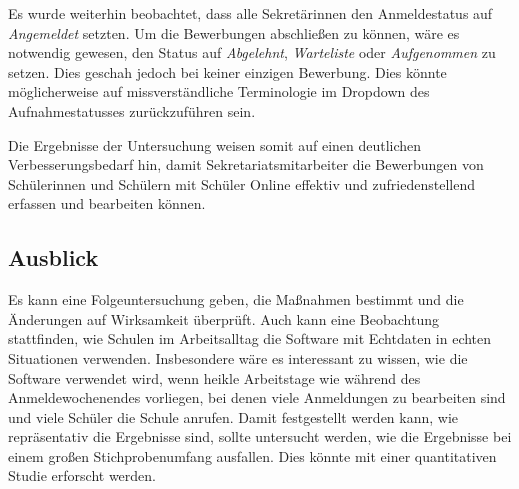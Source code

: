 Es wurde weiterhin beobachtet, dass alle Sekretärinnen den Anmeldestatus auf \textit{Angemeldet} setzten. Um die Bewerbungen abschließen zu können, wäre es notwendig gewesen, den Status auf \textit{Abgelehnt}, \textit{Warteliste} oder \textit{Aufgenommen} zu setzen. Dies geschah jedoch bei keiner einzigen Bewerbung. Dies könnte möglicherweise auf missverständliche Terminologie im Dropdown des Aufnahmestatusses zurückzuführen sein.

Die Ergebnisse der Untersuchung weisen somit auf einen deutlichen Verbesserungsbedarf hin, damit Sekretariatsmitarbeiter die Bewerbungen von Schülerinnen und Schülern mit Schüler Online effektiv und zufriedenstellend erfassen und bearbeiten können.

\subsection{Ausblick}
Es kann eine Folgeuntersuchung geben, die Maßnahmen bestimmt und die Änderungen auf Wirksamkeit überprüft.
Auch kann eine Beobachtung stattfinden, wie Schulen im Arbeitsalltag die Software mit Echtdaten in echten Situationen verwenden. Insbesondere wäre es interessant zu wissen, wie die Software verwendet wird, wenn heikle Arbeitstage wie während des Anmeldewochenendes vorliegen, bei denen viele Anmeldungen zu bearbeiten sind und viele Schüler die Schule anrufen.
Damit festgestellt werden kann, wie repräsentativ die Ergebnisse sind, sollte untersucht werden, wie die Ergebnisse bei einem großen Stichprobenumfang ausfallen. Dies könnte mit einer quantitativen Studie erforscht werden.
